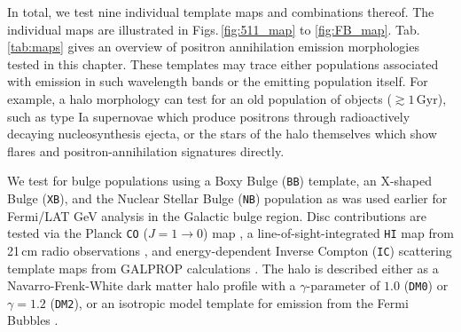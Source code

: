 \documentclass[doublespace,nopageskip]{VTthesis} %
\newcommand{\mrm}[1]{\mathrm{#1}}
\begin{document}
%



In total, we test nine individual template maps and combinations thereof. 
%
The individual maps are illustrated in Figs.\,\ref{fig:511_map} to \ref{fig:FB_map}. Tab.\,\ref{tab:maps} gives an overview of positron annihilation emission morphologies tested in this chapter.
%
These templates may trace either populations associated with emission in such wavelength bands or the emitting population itself.
%
For example, a halo morphology can test for an old population of objects ($\gtrsim 1\,\mrm{Gyr}$), such as type Ia supernovae which produce positrons through radioactively decaying nucleosynthesis ejecta, or the stars of the halo themselves which show flares and positron-annihilation signatures directly.

We test for bulge populations using a Boxy Bulge (\texttt{BB}) template, an X-shaped Bulge (\texttt{XB}), and the Nuclear Stellar Bulge (\texttt{NB}) population as was used earlier \cite[e.g., ][]{2018NatAs...2..387M,2018NatAs...2..819B} for Fermi/LAT GeV analysis in the Galactic bulge region.
%
Disc contributions are tested via the Planck \texttt{CO} ($J=1 \rightarrow 0$) map \citep{2016A&A...594A..10P}, a line-of-sight-integrated \texttt{HI} map from 21\,cm radio observations \citep{1990ARA&A..28..215D}, and energy-dependent Inverse Compton (\texttt{IC}) scattering template maps from GALPROP calculations \citep{2007ARNPS..57..285S}.
%
The halo is described either as a Navarro-Frenk-White \citep{1997ApJ...490..493N} dark matter halo profile with a $\gamma$-parameter of $1.0$ (\texttt{DM0}) or $\gamma=1.2$ (\texttt{DM2}), or an isotropic model template for emission from the Fermi Bubbles \citep[\texttt{FB}][]{2010ApJ...724.1044S}.
\end{document}
